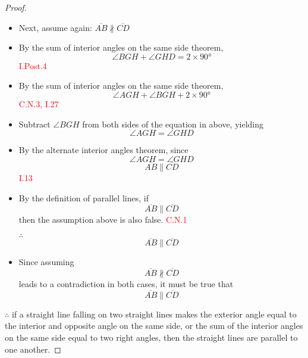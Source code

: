 \begin{proof}
\begin{itemize}
    \item Next, assume again: $\overline{AB} \nparallel  \overline{CD}$
    
        \clearpage
    
    \item By the sum of interior angles on the same side theorem, 
    \[ \angle{BGH} + \angle{GHD} =2\times\ang{90}\]\hfill\textcolor{red}{I.Post.4}
     
    \item By the sum of interior angles on the same side theorem, 
    \[\angle{AGH} + \angle{BGH} +2\times\ang{90}\]\hfill\textcolor{red}{C.N.3, I.27}
    
    \item Subtract $\angle{BGH}$ from both sides of the equation in above, yielding 
    \[\angle{AGH} = \angle{GHD}\]
    
    \item By the alternate interior angles theorem, since 
    \[\angle{AGH} = \angle{GHD}\] 
    \[\overline{AB} \parallel  \overline{CD}\]\hfill\textcolor{red}{I.13}
    
    \item By the definition of parallel lines, if 
    \[\overline{AB} \parallel  \overline{CD}\]
     then the assumption above is also false.\hfill\textcolor{red}{ C.N.1}
     
    \item[$\therefore$] 
    \[\overline{AB} \parallel  \overline{CD}\]
    
        \clearpage
    
    \item Since assuming 
    \[\overline{AB} \nparallel  \overline{CD}\]
     leads to a contradiction in both cases, it must be true that 
     \[\overline{AB} \parallel \overline{CD}\]
\end{itemize}

   $\therefore$ if a straight line falling on two straight lines makes the exterior angle equal to the interior and opposite angle on the same side, or the sum of the interior angles on the same side equal to two right angles, then the straight lines are parallel to one another.

\end{proof}

\clearpage

